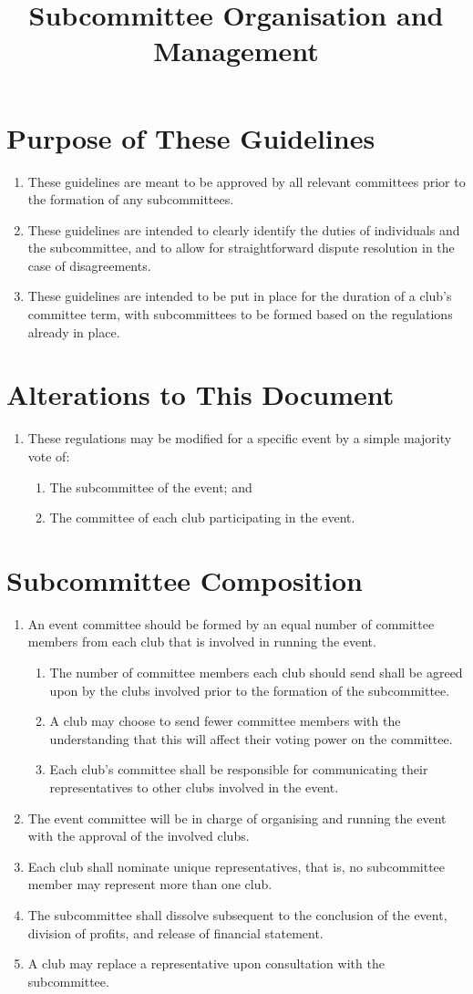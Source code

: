 \documentclass[a4paper]{article}
\title{Subcommittee Organisation and Management}
\author{}
\date{}
\newenvironment{enumsection}[1]{\section{#1} \begin{enumerate}[ref=\thesection.\theenumi]}{\end{enumerate}}
\begin{document}
\maketitle

\begin{enumsection}{Purpose of These Guidelines}
    \item These guidelines are meant to be approved by all relevant committees prior to the formation of any subcommittees.
    \item These guidelines are intended to clearly identify the duties of individuals and the subcommittee, and to allow for straightforward dispute resolution in the case of disagreements.
    \item These guidelines are intended to be put in place for the duration of a club's committee term, with subcommittees to be formed based on the regulations already in place.
\end{enumsection}

\begin{enumsection}{Alterations to This Document}
    \item These regulations may be modified for a specific event by a simple majority vote of:
    \begin{enumerate}
        \item The subcommittee of the event; and
        \item The committee of each club participating in the event.
    \end{enumerate}
\end{enumsection}

\begin{enumsection}{Subcommittee Composition}
    \item An event committee should be formed by an equal number of committee members from each club that is involved in running the event.
    \begin{enumerate}
        \item The number of committee members each club should send shall be agreed upon by the clubs involved prior to the formation of the subcommittee.
        \item A club may choose to send fewer committee members with the understanding that this will affect their voting power on the committee.
        \item Each club's committee shall be responsible for communicating their representatives to other clubs involved in the event.
    \end{enumerate}
    \item The event committee will be in charge of organising and running the event with the approval of the involved clubs.
    \item Each club shall nominate unique representatives, that is, no subcommittee member may represent more than one club.
    \item The subcommittee shall dissolve subsequent to the conclusion of the event, division of profits, and release of financial statement.
    \item A club may replace a representative upon consultation with the subcommittee.
\end{enumsection}
\end{document}
